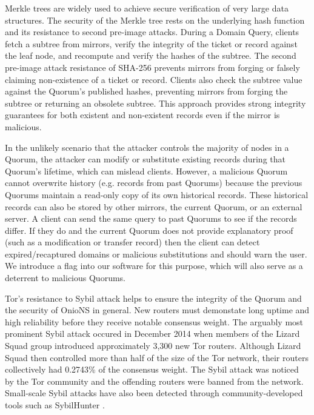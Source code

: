 \documentclass[USenglish,oneside,twocolumn]{article}
\begin{document}
Merkle trees are widely used to achieve secure verification of very large data structures.  The security of the Merkle tree rests on the underlying hash function and its resistance to second pre-image attacks. During a Domain Query, clients fetch a subtree from mirrors, verify the integrity of the ticket or record against the leaf node, and recompute and verify the hashes of the subtree. The second pre-image attack resistance of SHA-256 prevents mirrors from forging or falsely claiming non-existence of a ticket or record. Clients also check the subtree value against the Quorum's published hashes, preventing mirrors from forging the subtree or returning an obsolete subtree. This approach provides strong integrity guarantees for both existent and non-existent records even if the mirror is malicious.

In the unlikely scenario that the attacker controls the majority of nodes in a Quorum,  the attacker can modify or substitute existing records during that Quorum's lifetime, which can mislead clients. However, a malicious Quorum cannot overwrite history (e.g. records from past Quorums) because the previous Quorums maintain a read-only copy of its own historical records. These historical records can also be stored by other mirrors, the current Quorum, or an external server. A client can send the same query to past Quorums to see if the records differ. If they do and the current Quorum does not provide explanatory proof (such as a modification or transfer record) then the client can detect expired/recaptured domains or malicious substitutions and should warn the user. We introduce a flag into our software for this purpose, which will also serve as a deterrent to malicious Quorums.

Tor's resistance to Sybil attack helps to ensure the integrity of the Quorum and the security of OnioNS in general. New routers must demonstate long uptime and high reliability before they receive notable consensus weight. The arguably most prominent Sybil attack occured in December 2014 when members of the Lizard Squad group introduced approximately 3,300 new Tor routers. Although Lizard Squad then controlled more than half of the size of the Tor network, their routers collectively had 0.2743\% of the consensus weight. The Sybil attack was noticed by the Tor community and the offending routers were banned from the network. Small-scale Sybil attacks have also been detected through community-developed tools such as SybilHunter \cite{winter2016identifying}.
\end{document}
